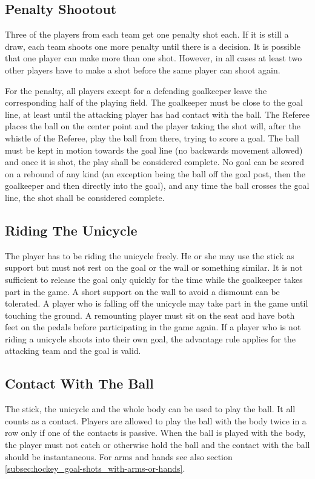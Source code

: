 \subsection{Penalty Shootout}
Three of the players from each team get one penalty shot each.
If it is still a draw, each team shoots one more penalty until there is a decision.
It is possible that one player can make more than one shot.
However, in all cases at least two other players have to make a shot before the same player can shoot again.

For the penalty, all players except for a defending goalkeeper leave the corresponding half of the playing field.
The goalkeeper must be close to the goal line, at least until the attacking player has had contact with the ball.
The Referee places the ball on the center point and the player taking the shot will, after the whistle of the Referee, play the ball from there, trying to score a goal.
The ball must be kept in motion towards the goal line (no backwards movement allowed) and once it is shot, the play shall be considered complete.
No goal can be scored on a rebound of any kind (an exception being the ball off the goal post, then the goalkeeper and then directly into the goal), and any time the ball crosses the goal line, the shot shall be considered complete.

\subsection{Riding The Unicycle}
The player has to be riding the unicycle freely.
He or she may use the stick as support but must not rest on the goal or the wall or something similar.
It is not sufficient to release the goal only quickly for the time while the goalkeeper takes part in the game.
A short support on the wall to avoid a dismount can be tolerated.
A player who is falling off the unicycle may take part in the game until touching the ground.
A remounting player must sit on the seat and have both feet on the pedals before participating in the game again.
If a player who is not riding a unicycle shoots into their own goal, the advantage rule applies for the attacking team and the goal is valid.

\subsection{Contact With The Ball}
The stick, the unicycle and the whole body can be used to play the ball.
It all counts as a contact.
Players are allowed to play the ball with the body twice in a row only if one of the contacts is passive.
When the ball is played with the body, the player must not catch or otherwise hold the ball and the contact with the ball should be instantaneous.
For arms and hands see also section \ref{subsec:hockey_goal-shots_with-arms-or-hands}.

